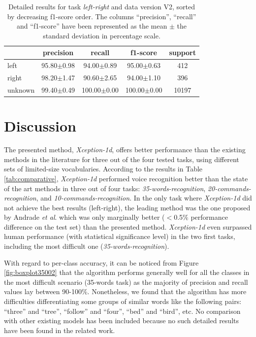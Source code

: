 \begin{table}[h] \centering \scriptsize
	\caption{Detailed results for task \textit{left-right} and data version V2, sorted by decreasing f1-score order. The columns ``precision'', ``recall'' and ``f1-score'' have been represented as the mean $\pm$ the standard deviation in percentage scale. } \label{tab:kwsperclassresults2}
	\begin{tabular}{lcccc}
		\toprule
		{} &       precision &           recall &         f1-score & support \\
		\midrule
		left      &  95.80$\pm$0.98 &   94.00$\pm$0.89 &   95.00$\pm$0.63 &     412 \\
		right     &  98.20$\pm$1.47 &   90.60$\pm$2.65 &   94.00$\pm$1.10 &     396 \\
		unknown   &  99.40$\pm$0.49 &  100.00$\pm$0.00 &  100.00$\pm$0.00 &   10197 \\
		\bottomrule
	\end{tabular}

\end{table}



\section{Discussion} \label{sec:discussion}

The presented method, \textit{Xception-1d}, offers better performance than the existing methods in the literature for three out of the four tested tasks, using different sets of limited-size vocabularies. According to the results in Table \ref{tab:comparative}, \textit{Xception-1d} performed voice recognition better than the state of the art methods  \autocite{Andrade2018, Zhang2017, Mcmahan2017, Warden2018} in three out of four tasks: \textit{35-words-recognition}, \textit{20-commands-recognition}, and \textit{10-commands-recognition}. In the only task where \textit{Xception-1d} did not achieve the best results (left-right), the leading method was the one proposed by Andrade \textit{et al}. \autocite{Andrade2018} which was only marginally better ($<$0.5\% performance difference on the test set) than the presented method. \textit{Xception-1d} even surpassed human performance (with statistical significance level) in the two first tasks, including the most difficult one (\textit{35-words-recognition}).

With regard to per-class accuracy, it can be noticed from Figure \ref{fig:boxplot35002} that the algorithm performs generally well for all the classes in the most difficult scenario (35-words task) as the majority of precision and recall values lay between 90-100\%. Nonetheless, we found that the algorithm has more difficulties differentiating some groups of similar words like the following pairs: ``three'' and ``tree'', ``follow'' and ``four'', ``bed'' and ``bird'', etc. No comparison with other existing models has been included because no such detailed results have been found in the related work.


